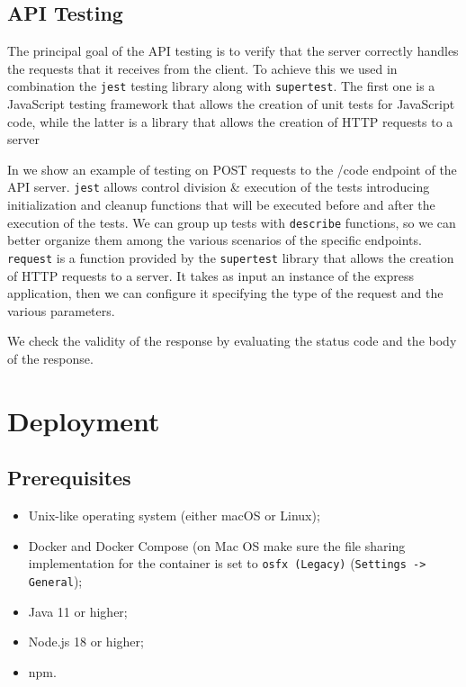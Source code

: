 \documentclass{scrartcl}
\begin{document}
\subsection{API Testing}
The principal goal of the API testing is to verify that the server correctly handles the requests that it receives from the client. To achieve this we used in combination the \texttt{jest} testing library along with \texttt{supertest}. The first one is a JavaScript testing framework that allows the creation of unit tests for JavaScript code, while the latter is a library that allows the creation of HTTP requests to a server


In  we show an example of testing on POST requests to the /code endpoint of the API server. \texttt {jest} allows control division \& execution of the tests introducing initialization and cleanup functions that will be executed before and after the execution of the tests. 
We can group up tests with \texttt{describe} functions, so we can better organize them among the various scenarios of the specific endpoints.
\texttt{request} is a function provided by the \texttt{supertest} library that allows the creation of HTTP requests to a server. It takes as input an instance of the express application, then we can configure it specifying the type of the request and the various parameters.

We check the validity of the response by evaluating the status code and the body of the response. 

\fi

\section{Deployment}

\subsection{Prerequisites}

\begin{itemize}
    \item Unix-like operating system (either macOS or Linux);
    \item Docker and Docker Compose (on Mac OS make sure the file sharing implementation for the container is set to \texttt{osfx (Legacy)} (\texttt{Settings -> General});
    \item Java 11 or higher;
    \item Node.js 18 or higher;
    \item npm.
\end{itemize}
\end{document}
